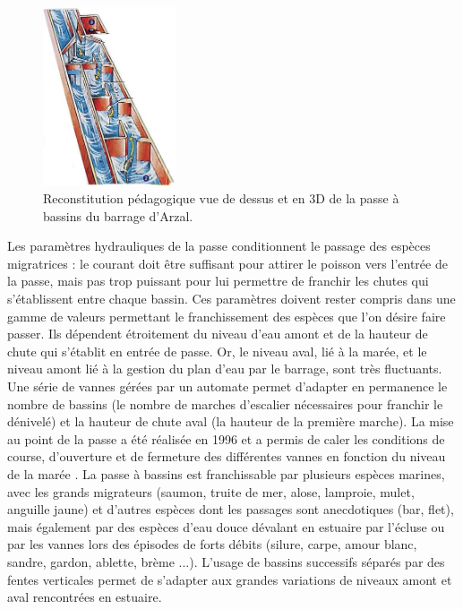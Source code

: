\documentclass[11pt,twocolumn,titlepage,twoside]{article}\usepackage[]{graphicx}\usepackage[]{color}
\begin{document}
\begin{figure}[htpb]
\centering
\includegraphics[width=0.35\textwidth]{passe_bassins.png}
\caption{Reconstitution pédagogique vue de dessus et en 3D de la passe à bassins du barrage d’Arzal.
}
\label{figure_passe_bassins}
\end{figure}

Les paramètres hydrauliques de la passe conditionnent le passage des espèces migratrices : le courant doit être suffisant
pour attirer le poisson vers l’entrée de la passe, mais pas trop puissant pour lui permettre de franchir les chutes
qui s’établissent entre chaque bassin. Ces paramètres doivent rester compris dans une gamme de valeurs permettant 
le franchissement des espèces que l’on désire faire passer. Ils dépendent étroitement du niveau d’eau amont et de
la hauteur de chute qui s’établit en entrée de passe. Or, le niveau aval, lié à
la marée, et le niveau amont lié à la gestion du plan d’eau par le barrage, sont très fluctuants. Une série de vannes gérées par un automate permet d’adapter en permanence 
le nombre de bassins (le nombre de marches d’escalier nécessaires pour franchir le dénivelé) et la hauteur de chute aval 
(la hauteur de la première marche). La mise au point de la passe a été réalisée en 1996 et a permis de caler les 
conditions de course, d’ouverture et de fermeture des différentes vannes en
fonction du niveau de la marée \citep{briand_suivi_1998}.
La passe à bassins est franchissable par plusieurs espèces marines, avec les grands migrateurs
(saumon, truite de mer, alose, lamproie, mulet, anguille jaune) et d’autres
espèces dont les passages sont anecdotiques (bar, flet), mais également par des espèces d’eau douce dévalant en estuaire par l’écluse 
ou par les vannes lors des épisodes de forts débits (silure, carpe, amour
blanc, sandre, gardon, ablette, brème ...). 
L'usage de bassins successifs séparés par des fentes verticales permet de
s’adapter aux grandes variations de niveaux amont et aval rencontrées en estuaire.
\end{document}
